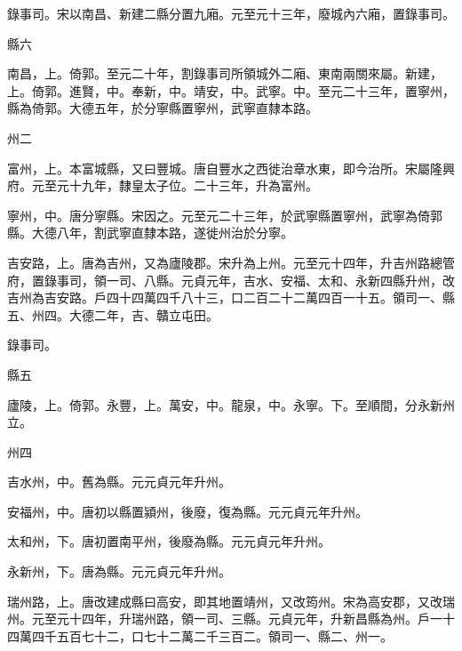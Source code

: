 \begin{pinyinscope}
 錄事司。宋以南昌、新建二縣分置九廂。元至元十三年，廢城內六廂，置錄事司。



 縣六



 南昌，上。倚郭。至元二十年，割錄事司所領城外二廂、東南兩關來屬。新建，上。倚郭。進賢，中。奉新，中。靖安，中。武寧。中。至元二十三年，置寧州，縣為倚郭。大德五年，於分寧縣置寧州，武寧直隸本路。



 州二



 富州，上。本富城縣，又曰豐城。唐自豐水之西徙治章水東，即今治所。宋屬隆興府。元至元十九年，隸皇太子位。二十三年，升為富州。



 寧州，中。唐分寧縣。宋因之。元至元二十三年，於武寧縣置寧州，武寧為倚郭縣。大德八年，割武寧直隸本路，遂徙州治於分寧。



 吉安路，上。唐為吉州，又為廬陵郡。宋升為上州。元至元十四年，升吉州路總管府，置錄事司，領一司、八縣。元貞元年，吉水、安福、太和、永新四縣升州，改吉州為吉安路。戶四十四萬四千八十三，口二百二十二萬四百一十五。領司一、縣五、州四。大德二年，吉、贛立屯田。



 錄事司。



 縣五



 廬陵，上。倚郭。永豐，上。萬安，中。龍泉，中。永寧。下。至順間，分永新州立。



 州四



 吉水州，中。舊為縣。元元貞元年升州。



 安福州，中。唐初以縣置潁州，後廢，復為縣。元元貞元年升州。



 太和州，下。唐初置南平州，後廢為縣。元元貞元年升州。



 永新州，下。唐為縣。元元貞元年升州。



 瑞州路，上。唐改建成縣曰高安，即其地置靖州，又改筠州。宋為高安郡，又改瑞州。元至元十四年，升瑞州路，領一司、三縣。元貞元年，升新昌縣為州。戶一十四萬四千五百七十二，口七十二萬二千三百二。領司一、縣二、州一。




\end{pinyinscope}
